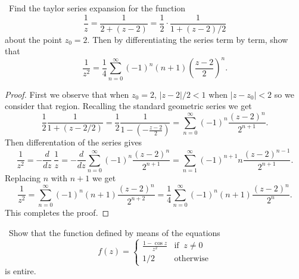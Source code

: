 \documentclass[11pt]{amsart}
\theoremstyle{definition}
\numberwithin{theorem}{section}
\numberwithin{definition}{section}
\numberwithin{equation}{section}
\begin{document}
 \medskip {}\ Find the taylor series expansion for the function 
 \begin{equation*}
  	\frac{1}{z} = \frac{1}{2 + (z-2)} = \frac{1}{2} \cdot \frac{1}{1 + (z-2)/2}
\end{equation*} 
about the point $z_0 = 2.$ Then by differentiating the series term by term, show that
\begin{equation*}
	\frac{1}{z^2} = \frac{1}{4} \sum_{n=0}^\infty (-1)^n(n+1) \left(\frac{z-2}{2}\right)^n.
\end{equation*}
\begin{proof}
	First we observe that when $z_0 = 2$, $|z-2|/2 < 1$ when $|z-z_0| < 2$ so we consider that region. Recalling the standard geometric series we get
	\begin{equation*}
		\frac{1}{2}\frac{1}{1 + (z-2/2)} = \frac{1}{2} \frac{1}{1 - (-\frac{z-2}{2})} = \sum_{n=0}^\infty (-1)^n\frac{(z-2)^n}{2^{n+1}}.
	\end{equation*}
	Then differentation of the series gives
	\begin{equation*}
		\frac{1}{z^2}= -\frac{d}{dz}\  \frac{1}{z} = -\frac{d}{dz}  \sum_{n=0}^\infty (-1)^n\frac{(z-2)^n}{2^{n+1}} =  \sum_{n=1}^\infty (-1)^{n+1}n\frac{(z-2)^{n-1}}{2^{n+1}}. 
	\end{equation*}
	Replacing $n$ with $n+1$ we get
	\begin{equation*}
	\frac{1}{z^2} =  \sum_{n=0}^\infty (-1)^n(n+1)\frac{(z-2)^{n}}{2^{n+2}} = \frac{1}{4} \sum_{n=0}^\infty (-1)^n(n+1)\frac{(z-2)^{n}}{2^{n}}.
	\end{equation*}
	This completes the proof.
\end{proof}
\medskip {}\ Show that the function defined by means of the equations
\begin{equation*}	
	f(z) = \begin{cases}
		\frac{1-\cos z}{z^2} & \text{if }\ z \neq 0 \\
		1/2 &\text{otherwise}
	\end{cases} 
\end{equation*}
is entire.
\end{document}
